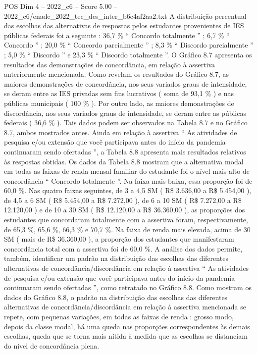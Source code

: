\begin{textsample}{POS Dim 4 – 2022\_c6 – Score 5.00 – 2022\_c6/enade\_2022\_tec\_des\_inter\_b6c4af2aa2.txt}
A distribuição percentual das escolhas das alternativas de respostas pelos estudantes provenientes de IES públicas federais foi a seguinte : 36,7 \% “ Concordo totalmente ” ; 6,7 \% “ Concordo ” ; 20,0 \% “ Concordo parcialmente ” ; 8,3 \% “ Discordo parcialmente ” ; 5,0 \% “ Discordo ” e 23,3 \% “ Discordo totalmente ”.
O Gráfico 8.7 apresenta os resultados das demonstrações de concordância, em relação à assertiva anteriormente mencionada.
Como revelam os resultados do Gráfico 8.7, as maiores demonstrações de concordância, nos seus variados graus de intensidade, se deram entre as IES privadas sem fins lucrativos ( soma de 93,1 \% ) e nas públicas municipais ( 100 \% ).
Por outro lado, as maiores demonstrações de discordância, nos seus variados graus de intensidade, se deram entre as públicas federais ( 36,6 \% ).
Tais dados podem ser observados na Tabela 8.7 e no Gráfico 8.7, ambos mostrados antes.
Ainda em relação à assertiva “ As atividades de pesquisa e/ou extensão que você participava antes do início da pandemia continuaram sendo ofertadas ”, a Tabela 8.8 apresenta mais resultados relativos às respostas obtidas.
Os dados da Tabela 8.8 mostram que a alternativa modal em todas as faixas de renda mensal familiar do estudante foi o nível mais alto de concordância “ Concordo totalmente ”.
Na faixa mais baixa, essa proporção foi de 60,0 \%.
Nas quatro faixas seguintes, de 3 a 4,5 SM ( R\$ 3.636,00 a R\$ 5.454,00 ), de 4,5 a 6 SM ( R\$ 5.454,00 a R\$ 7.272,00 ), de 6 a 10 SM ( R\$ 7.272,00 a R\$ 12.120,00 ) e de 10 a 30 SM ( R\$ 12.120,00 a R\$ 36.360,00 ), as proporções dos estudantes que concordaram totalmente com a assertiva foram, respectivamente, de 65,3 \%, 65,6 \%, 66,3 \% e 70,7 \%.
Na faixa de renda mais elevada, acima de 30 SM ( mais de R\$ 36.360,00 ), a proporção dos estudantes que manifestaram concordância total com a assertiva foi de 60,0 \%.
A análise dos dados permite, também, identificar um padrão na distribuição das escolhas das diferentes alternativas de concordância/discordância em relação à assertiva “ As atividades de pesquisa e/ou extensão que você participava antes do início da pandemia continuaram sendo ofertadas ”, como retratado no Gráfico 8.8.
Como mostram os dados do Gráfico 8.8, o padrão na distribuição das escolhas das diferentes alternativas de concordância/discordância em relação à assertiva mencionada se repete, com pequenas variações, em todas as faixas de renda : grosso modo, depois da classe modal, há uma queda nas proporções correspondentes às demais escolhas, queda que se torna mais nítida à medida que as escolhas se distanciam do nível de concordância plena.

\end{textsample}
